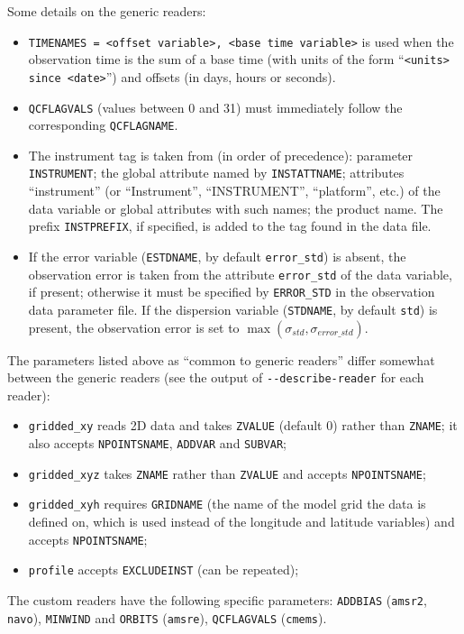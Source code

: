 \documentclass[11pt]{report}
\begin{document}
Some details on the generic readers:
\begin{itemize}
\item \verb|TIMENAMES = <offset variable>, <base time variable>| is used when the observation time is the sum of a base time (with units of the form ``\verb|<units> since <date>|'') and offsets (in days, hours or seconds).
\item \verb|QCFLAGVALS| (values between 0 and 31) must immediately follow the corresponding \verb|QCFLAGNAME|.
\item The instrument tag is taken from (in order of precedence): parameter \verb|INSTRUMENT|; the global attribute named by \verb|INSTATTNAME|; attributes ``instrument'' (or ``Instrument'', ``INSTRUMENT'', ``platform'', etc.) of the data variable or global attributes with such names; the product name. The prefix \verb|INSTPREFIX|, if specified, is added to the tag found in the data file.
\item If the error variable (\verb|ESTDNAME|, by default \verb|error_std|) is absent, the observation error is taken from the attribute \verb|error_std| of the data variable, if present; otherwise it must be specified by \verb|ERROR_STD| in the observation data parameter file. If the dispersion variable (\verb|STDNAME|, by default \verb|std|) is present, the observation error is set to $\max(\sigma_{std}, \sigma_{error\_std})$.
\end{itemize}

The parameters listed above as ``common to generic readers'' differ somewhat between the generic readers (see the output of \verb|--describe-reader| for each reader):
\begin{itemize}
\item \verb|gridded_xy| reads 2D data and takes \verb|ZVALUE| (default 0) rather than \verb|ZNAME|; it also accepts \verb|NPOINTSNAME|, \verb|ADDVAR| and \verb|SUBVAR|;
\item \verb|gridded_xyz| takes \verb|ZNAME| rather than \verb|ZVALUE| and accepts \verb|NPOINTSNAME|;
\item \verb|gridded_xyh| requires \verb|GRIDNAME| (the name of the model grid the data is defined on, which is used instead of the longitude and latitude variables) and accepts \verb|NPOINTSNAME|;
\item \verb|profile| accepts \verb|EXCLUDEINST| (can be repeated);
\end{itemize}
The custom readers have the following specific parameters: \verb|ADDBIAS| (\verb|amsr2|, \verb|navo|), \verb|MINWIND| and \verb|ORBITS| (\verb|amsre|), \verb|QCFLAGVALS| (\verb|cmems|).
\end{document}
